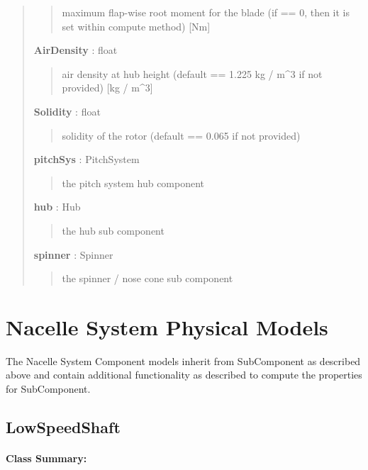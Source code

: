 \documentclass[letterpaper,10pt,openany,oneside]{sphinxmanual}
\begin{document}
\begin{fulllineitems}
\begin{quote}
\begin{description}
\begin{quote}
maximum flap-wise root moment for the blade (if == 0, then it is set within compute method) {[}Nm{]}
\end{quote}

\textbf{AirDensity} : float
\begin{quote}

air density at hub height (default == 1.225 kg / m\textasciicircum{}3 if not provided) {[}kg / m\textasciicircum{}3{]}
\end{quote}

\textbf{Solidity} : float
\begin{quote}

solidity of the rotor (default == 0.065 if not provided)
\end{quote}

\textbf{pitchSys} : PitchSystem
\begin{quote}

the pitch system hub component
\end{quote}

\textbf{hub} : Hub
\begin{quote}

the hub sub component
\end{quote}

\textbf{spinner} : Spinner
\begin{quote}

the spinner / nose cone sub component
\end{quote}

\end{description}\end{quote}

\end{fulllineitems}



\section{Nacelle System Physical Models}
\label{documentation:nacelle-system-physical-models}
The Nacelle System Component models inherit from SubComponent as described above and contain additional functionality as described to compute the properties for SubComponent.


\subsection{LowSpeedShaft}
\label{documentation:lowspeedshaft}\label{documentation:lowspeedshaft-class-label}\paragraph{Class Summary:}
\end{document}
